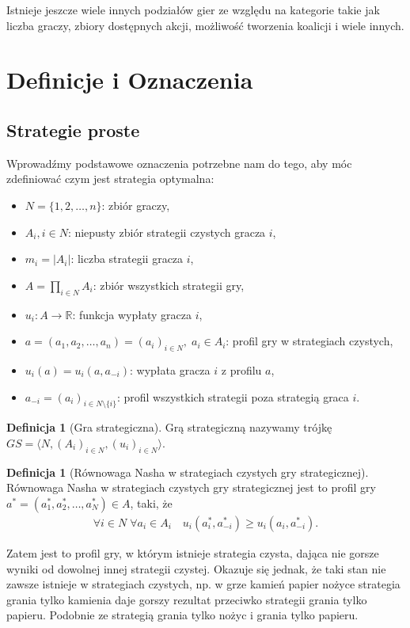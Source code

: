 \documentclass[inzynierska]{pwr_wmat_praca_dyplomowa}
\theoremstyle{plain}
\numberwithin{theorem}{chapter}
\theoremstyle{definition}
\numberwithin{theorem}{chapter}
\newtheorem{definition}[theorem]{Definicja}
\begin{document}
Istnieje jeszcze wiele innych podziałów gier ze względu na kategorie takie jak liczba graczy, zbiory dostępnych akcji, możliwość tworzenia koalicji i wiele innych.
\section{Definicje i Oznaczenia}
\subsection{Strategie proste}
Wprowadźmy podstawowe oznaczenia potrzebne nam do tego, aby móc zdefiniować czym jest strategia optymalna:
\begin{itemize}
	\item $ N = \{1, 2, \dots, n\} $: zbiór graczy,
	\item $A_i, i \in N $: niepusty zbiór strategii  czystych gracza $i$,
	\item $m_i = |A_i|$: liczba strategii gracza $i$,
	\item $A = \prod_{i \in N} A_i$: zbiór wszystkich strategii gry, 
	\item $u_i : A \rightarrow \mathbb{R} $: funkcja wypłaty gracza $i$,
	\item $a=(a_1, a_2, \dots, a_n)=(a_i)_{i \in N},\; a_i \in A_i$: profil gry w strategiach czystych,
	\item $u_i(a) = u_i(a, a_{-i})$: wypłata gracza $i$ z profilu $a$,
	\item $a_{-i} = (a_i)_{i\in N \setminus \{i\}}$: profil wszystkich strategii poza strategią graca $i$.
\end{itemize}
	\begin{definition}[Gra strategiczna]
		Grą strategiczną nazywamy trójkę $GS = \langle N,  (A_i)_{i \in N}, (u_i)_{i \in N} \rangle $.
	\end{definition}
	
	\begin{definition}[Równowaga Nasha w strategiach czystych gry strategicznej]
		Równowaga Nasha w strategiach czystych gry strategicznej jest to profil gry $a^*= (a_1^*, a_2^*, \dots, a_N^*)\in A$, taki, że
		\begin{align*}
			\mathop{\forall}{i \in N}\;
			\mathop{\forall}{a_i \in A_i} \quad
			u_i(a_i^*, a_{-i}^*) \ge u_i(a_i, a_{-i}^*).
		\end{align*}
	\end{definition}
	Zatem jest to profil gry, w którym istnieje strategia czysta, dająca nie gorsze wyniki od dowolnej innej strategii czystej.
	Okazuje się jednak, że taki stan nie zawsze istnieje w strategiach czystych, np. w grze kamień papier nożyce strategia grania tylko kamienia daje gorszy rezultat przeciwko strategii grania tylko papieru. Podobnie ze strategią grania tylko nożyc i grania tylko papieru.
\end{document}
